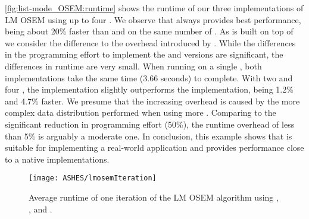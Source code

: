 \autoref{fig:list-mode_OSEM:runtime} shows the runtime of our three implementations of LM OSEM using up to four \GPUs.
We observe that \CUDA always provides best performance, being about 20\% faster than \OpenCL and \SkelCL on the same number of \GPUs.
As \SkelCL is built on top of \OpenCL we consider the difference to \OpenCL the overhead introduced by \SkelCL.
While the differences in the programming effort to implement the \SkelCL and \OpenCL versions are significant, the differences in runtime are very small.
When running on a single \GPU, both implementations take the same time (3.66 seconds) to complete.
With two and four \GPUs, the \OpenCL implementation slightly outperforms the \SkelCL implementation, being 1.2\% and 4.7\% faster.
We presume that the increasing overhead is caused by the more complex data distribution performed when using more \GPUs.
Comparing to the significant reduction in programming effort (50\%), the runtime overhead of less than 5\% is arguably a moderate one.
In conclusion, this example shows that \SkelCL is suitable for implementing a real-world application and provides performance close to a native \OpenCL implementations.

\begin{figure}
  \centering
  \texttt{[image: ASHES/lmosemIteration]}
  \caption{Average runtime of one iteration of the LM OSEM algorithm using \SkelCL, \OpenCL, and \CUDA.}
  \label{fig:list-mode_OSEM:runtime}
\end{figure}


